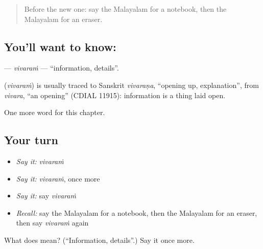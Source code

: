 \begin{quote}
Before the new one: say the Malayalam for a notebook, then the Malayalam for an eraser.
\end{quote}

\subsection*{You'll want to know: }
\textbf{} — \emph{vivaraṁ} — \textquotedblleft{}information, details\textquotedblright{}.

\begin{cousinweb}
\textbf{} (\emph{vivaraṁ}) is usually traced to Sanskrit \emph{vivaraṇa}, \textquotedblleft{}opening up, explanation\textquotedblright{}, from \emph{vivara}, \textquotedblleft{}an opening\textquotedblright{} (CDIAL 11915): information is a thing laid open.
\end{cousinweb}

\begin{grammarlens}[title={What you've built}]
One more word for this chapter.
\end{grammarlens}

\subsection*{Your turn}
\begin{itemize}
\raggedright
  \item \emph{Say it:} \emph{vivaraṁ}
  \item \emph{Say it:} \emph{vivaraṁ}, once more
  \item \emph{Say it:} say \emph{vivaraṁ}
  \item \emph{Recall:} say the Malayalam for a notebook, then the Malayalam for an eraser, then say \emph{vivaraṁ} again
\end{itemize}

\begin{tcolorbox}[breakable,colback=teal!4,colframe=teal!35!black,title={Before you move on}]
What does  mean? (\textquotedblleft{}Information, details\textquotedblright{}.) Say it once more.
\end{tcolorbox}
